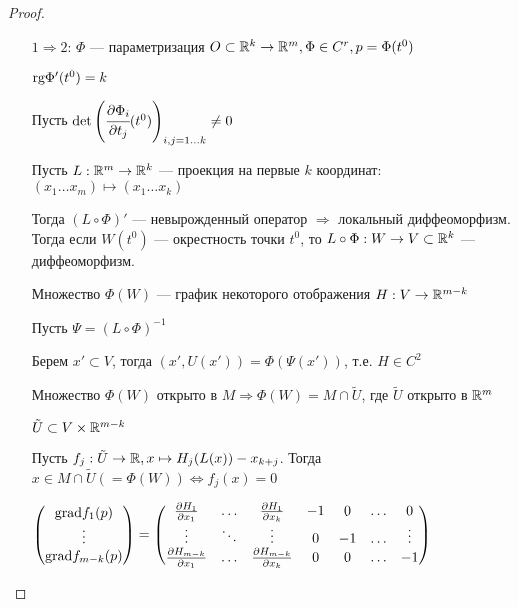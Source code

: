 \begin{proof}\itemfix
    \begin{itemize}
        \item [$1 \Rightarrow 2$:] $\Phi$ --- параметризация $O\subset\mathbb{R}^k\to\mathbb{R}^m, \Phi\in C^r, p=\Phi(t^0)$

              $\text{rg} \Phi'(t^0) = k$

              Пусть $\det \left(\cfrac{\partial \Phi_i}{\partial t_j}(t^0)\right)_{i,j = 1\ldots k} \not=0$

              Пусть $L : \mathbb{R}^m\to\mathbb{R}^k$ --- проекция на первые $k$ координат: $(x_1\ldots x_m)\mapsto (x_1\ldots x_k)$

              Тогда $(L \circ \Phi)'$ --- невырожденный оператор $\Rightarrow$ локальный диффеоморфизм. Тогда если $W(t^0)$ --- окрестность точки $t^0$, то $L\circ \Phi : W \to V\subset\mathbb{R}^k$ --- диффеоморфизм.

              Множество $\Phi(W)$ --- график некоторого отображения $H : V\to\mathbb{R}^{m-k}$

              Пусть $\Psi = (L \circ \Phi)^{-1}$

              Берем $x' \subset V$, тогда $(x', U(x')) = \Phi(\Psi(x'))$, т.е. $H\in C^2$

              Множество $\Phi(W)$ открыто в $M \Rightarrow \Phi(W) = M \cap \tilde U$, где $\tilde U$ открыто в $\mathbb{R}^m$

              \? $\tilde U\subset V\times \mathbb{R}^{m-k}$

              Пусть $f_j : \tilde U \to\mathbb{R}, x\mapsto H_j(L(x)) - x_{k+j}$. Тогда $x\in M\cap \tilde U (=\Phi(W)) \Leftrightarrow f_j(x)=0$

              $\begin{pmatrix}
                      \text{grad} f_1(p) \\
                      \vdots       \\
                      \text{grad} f_{m-k}(p)
                  \end{pmatrix} = \begin{pmatrix}
                      \frac{\partial H_1}{\partial x_1}     & \ldots & \frac{\partial H_1}{\partial x_k}     & -1 & 0  & \ldots & 0      \\
                      \vdots                                & \ddots & \vdots                                & 0  & -1 & \ldots & \vdots \\
                      \frac{\partial H_{m-k}}{\partial x_1} & \ldots & \frac{\partial H_{m-k}}{\partial x_k} & 0  & 0  & \ldots & -1     \\
                  \end{pmatrix}$



\end{itemize}
\end{proof}
